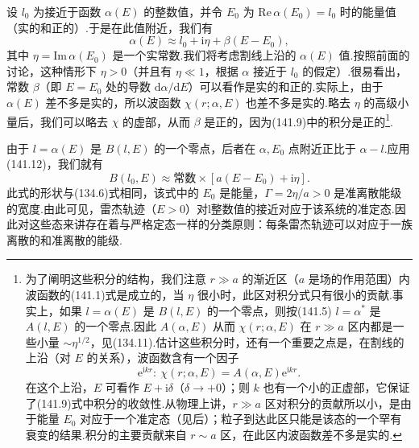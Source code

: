 设 $l_0$ 为接近于函数 $\alpha(E)$ 的整数值，并令 $E_0$ 为
$\mathrm{Re}\,\alpha(E_0)=l_0$ 时的能量值（实的和正的）.于是在此值附近，我们有
\begin{equation}
  \alpha(E)\approx l_0+\mathrm{i}\eta+\beta(E-E_0),
\end{equation}
其中 $\eta=\mathrm{Im}\,\alpha(E_0)$ 是一个实常数.我们将考虑割线上沿的 $\alpha(E)$ 值.按照前面的讨论，这种情形下 $\eta>0$（并且有 $\eta\ll1$，根据 $\alpha$ 接近于 $l_0$ 的假定）.很易看出，常数 $\beta$（即 $E=E_0$ 处的导数 $\mathrm{d}\alpha/\mathrm{d}E$）可以看作是实的和正的.实际上，由于 $\alpha(E)$ 差不多是实的，所以波函数 $\chi(r;\alpha,E)$ 也差不多是实的.略去 $\eta$ 的高级小量后，我们可以略去 $\chi$ 的虚部，从而 $\beta$ 是正的，因为(141.9)中的积分是正的\footnote{为了阐明这些积分的结构，我们注意 $r\gg a$ 的渐近区（$a$ 是场的作用范围）内波函数的(141.1)式是成立的，当 $\eta$ 很小时，此区对积分式只有很小的贡献.事实上，如果 $l=\alpha(E)$ 是 $B(l,E)$ 的一个零点，则按(141.5) $l=\alpha^{*}$ 是 $A(l,E)$ 的一个零点.因此 $A(\alpha,E)$ 从而 $\chi(r;\alpha,E)$ 在 $r\gg a$ 区内都是一些小量 $\sim\eta^{1/2}$，见(134.11).估计这些积分时，还有一个重要之点是，在割线的上沿（对 $E$ 的关系），波函数含有一个因子
\begin{equation*}
  \mathrm{e}^{\mathrm{i}kr}\colon\ \chi(r;\alpha,E)=A(\alpha,E)\mathrm{e}^{\mathrm{i}kr}.
\end{equation*}
在这个上沿，$E$ 可看作 $E+\mathrm{i}\delta$（$\delta\to+0$）；则 $k$ 也有一个小的正虚部，它保证了(141.9)式中积分的收敛性.从物理上讲，$r\gg a$ 区对积分的贡献所以小，是由于能量 $E_0$ 对应于一个准定态（见后）；粒子到达此区只能是该态的一个罕有衰变的结果.积分的主要贡献来自 $r\sim a$ 区，在此区内波函数差不多是实的.}.

由于 $l=\alpha(E)$ 是 $B(l,E)$ 的一个零点，后者在 $\alpha,E_0$ 点附近正比于 $\alpha-l$.应用(141.12)，我们就有
\begin{equation}
  B(l_0,E)\approx\text{常数}\times
  \left[a(E-E_0)+\mathrm{i}\eta\right].
\end{equation}
此式的形状与(134.6)式相同，该式中的 $E_0$ 是能量，$\Gamma=2\eta/a>0$ 是准离散能级的宽度.由此可见，雷杰轨迹（$E>0$）对l整数值的接近对应于该系统的准定态.因此对这些态来讲存在着与严格定态一样的分类原则：每条雷杰轨迹可以对应于一族离散的和准离散的能级.

